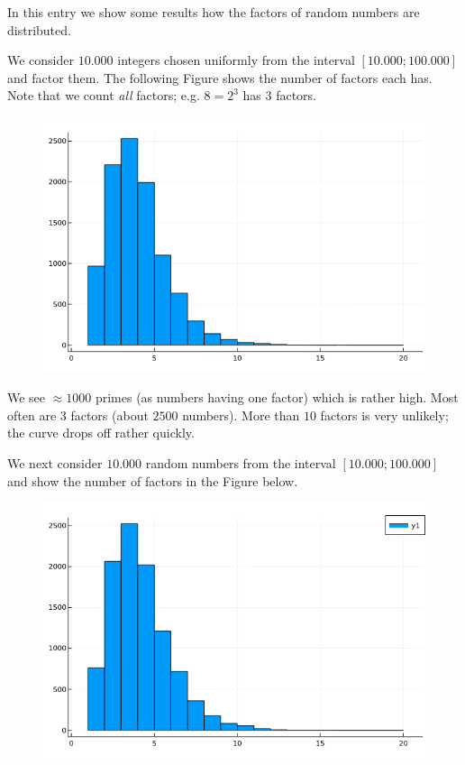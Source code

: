 
In this entry we show some results how the factors of random numbers are distributed.

We consider $10.000$ integers chosen uniformly from the interval $[10.000 ; 100.000]$ and factor them. The following Figure shows the number of factors each has. Note that we count \emph{all} factors; e.g. $8 = 2^3$ has $3$ factors.

\begin{figure}[H]
    \centering
    \includegraphics[scale=0.5]{images/primes_03_01.png}
\end{figure}


We see $\approx 1000$ primes (as numbers having one factor) which is rather high. Most often are $3$ factors (about $2500$ numbers). More than $10$ factors is very unlikely; the curve drops off rather quickly.

We next consider $10.000$ random numbers from the interval $[10.000 ; 100.000]$ and show the number of factors in the Figure below.

\begin{figure}[H]
    \centering
    \includegraphics[scale=0.5]{images/primes_03_02.png}
\end{figure}



